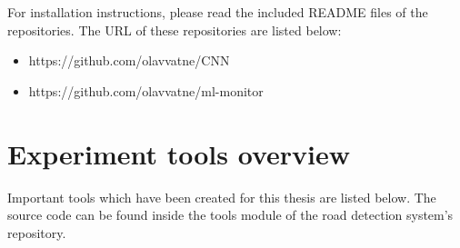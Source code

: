 For installation instructions, please read the included README files of the repositories. The URL of these repositories are listed below:

\begin{itemize}
\item https://github.com/olavvatne/CNN
\item https://github.com/olavvatne/ml-monitor
\end{itemize} 

\section{Experiment tools overview}
\label{app:tools}
Important tools which have been created for this thesis are listed below. The source code can be found inside the tools module of the road detection system's repository.
